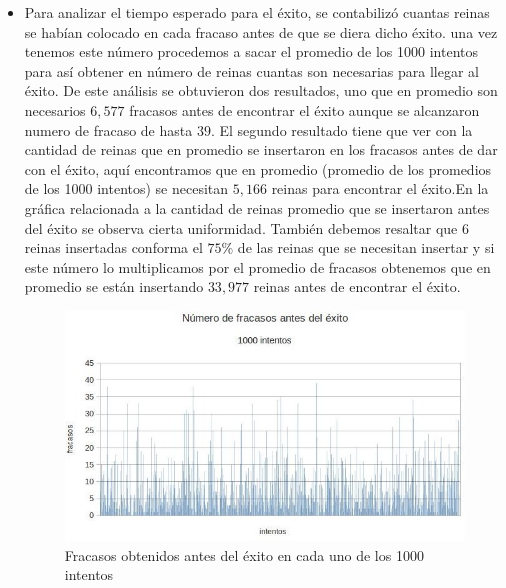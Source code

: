\documentclass[a4paper,10pt]{article}
\begin{document}
\begin{itemize}
\item Para analizar el tiempo esperado para el éxito, se contabilizó cuantas reinas se habían colocado en cada fracaso antes de que se diera dicho éxito. una vez tenemos este número procedemos a sacar
el promedio de los 1000 intentos para así obtener en número de reinas cuantas son necesarias para llegar al éxito. De este análisis se obtuvieron dos resultados, uno que en promedio son necesarios $6,577$ 
fracasos antes de encontrar el éxito aunque se alcanzaron numero de fracaso de hasta $39$. El segundo resultado tiene que ver con la cantidad de reinas que en promedio se insertaron en los fracasos
antes de dar con el éxito, aquí encontramos que en promedio (promedio de los promedios de los 1000 intentos) se necesitan $5,166$ reinas para encontrar el éxito.En la gráfica relacionada a la cantidad de reinas
promedio que se insertaron antes del éxito se observa cierta uniformidad. También debemos resaltar que 6 reinas insertadas conforma el $75\%$ de las reinas que se necesitan insertar y si este número
lo multiplicamos por el promedio de fracasos obtenemos que en promedio se están insertando $33,977$ reinas antes de encontrar el éxito.

\begin{figure}[h]
 \centering
 \includegraphics[scale=0.5]{fracasos.jpg}
 \caption{Fracasos obtenidos antes del éxito en cada uno de los 1000 intentos}
 \label{fig:fracasos}
\end{figure}



\end{itemize}
\end{document}
